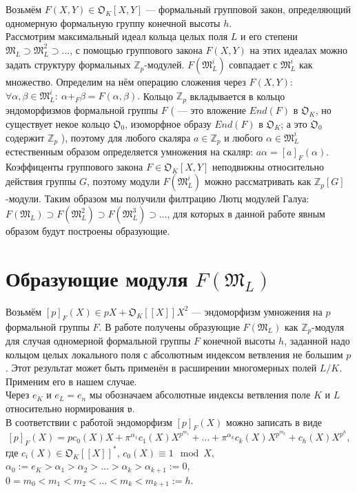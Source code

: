 \documentclass[a4paper]{article}
\newcommand{\Zp}{\mathbb{Z}_p}
\newcommand{\ML}{\mathfrak{M}_L}
\newcommand{\OK}{\mathfrak{O}_K}
\newcommand{\val}{\mathfrak{v}}
\begin{document}
Возьмём $F(X,Y)\in\OK[X,Y]$ --- формальный групповой закон, определяющий одномерную формальную группу конечной высоты $h$.\\ 
Рассмотрим максимальный идеал кольца целых поля $L$ и его степени $\ML\supset\ML^2\supset\dots$, с помощью группового закона $F(X,Y)$ на этих идеалах можно задать структуру формальных $\Zp$-модулей. $F(\ML^i)$ совпадает с $\ML^i$ как множество. Определим на нём операцию сложения через $F(X,Y)$: $\forall\alpha,\beta\in\ML^i:\ \alpha+_F\beta=F(\alpha,\beta).$ Кольцо $\Zp$ вкладывается в кольцо эндоморфизмов формальной группы $F$ (\cite[\S 2]{book6} --- это вложение $End(F)$ в $\OK$, но существует некое кольцо $\mathfrak{O}_0$, изоморфное образу $End(F)$ в $\OK$; а это $\mathfrak{O}_0$ содержит $\Zp$ \cite[\S2.3]{book6}), поэтому для любого скаляра $a\in\Zp$ и любого $\alpha\in\ML^i$ естественным образом определяется умножения на скаляр: $a\alpha=[a]_F(\alpha)$.\\
Коэффиценты группового закона $F \in \OK[X,Y]$ неподвижны относительно действия группы $G$, поэтому модули $F(\ML^i)$ можно рассматривать как $\Zp[G]$-модули. Таким образом мы получили филтрацию Лютц модулей Галуа: $F(\ML) \supset F(\ML^2) \supset F(\ML^3) \supset \ldots$, для которых в данной работе явным образом будут построены образующие.

\section{Образующие модуля $F(\ML)$}

Возьмём $[p]_F(X) \in pX+\OK[[X]]X^2$ --- эндоморфизм умножения на $p$ формальной группы $F$. В работе \cite[Арифметика формального модуля]{book2} получены образующие $F(\ML)$ как $\Zp$-модуля для случая одномерной формальной группы $F$ конечной высоты $h$, заданной надо кольцом целых локального поля с абсолютным индексом ветвления не большим $p$. Этот результат может быть применён в расширении многомерных полей $L/K$. Применим его в нашем случае.\\

Через $e_K$ и $e_L = e_n$ мы обозначаем абсолютные индексы ветвления поле $K$ и $L$ относительно нормирования $\val$. \\
В соответствии с работой \cite{book2} эндоморфизм $[p]_F(X)$ можно записать в виде
$$[p]_F(X)=pc_0(X)X+\pi^{\alpha_1}c_1(X)X^{p^{m_1}}+\dots+\pi^{\alpha_k}c_k(X)X^{p^{m_k}}+c_h(X)X^{p^h},$$
где $c_i(X) \in \OK[[X]]^*$, $c_0(X) \equiv 1 \mod X$, $\alpha_0:=e_K>\alpha_1>\alpha_2>\dots>\alpha_k>\alpha_{k+1}:=0$, $0=m_0<m_1<m_2<\dots<m_k<m_{k+1}:=h$.
\end{document}
